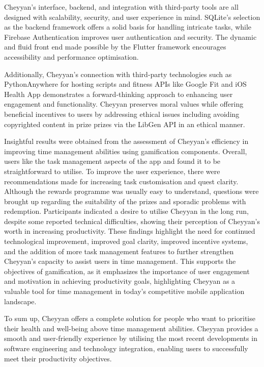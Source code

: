 \documentclass{l4proj}
\begin{document}
Cheyyan's interface, backend, and integration with third-party tools are all designed with scalability, security, and user experience in mind. SQLite's selection as the backend framework offers a solid basis for handling intricate tasks, while Firebase Authentication improves user authentication and security. The dynamic and fluid front end made possible by the Flutter framework encourages accessibility and performance optimisation.

Additionally, Cheyyan's connection with third-party technologies such as PythonAnywhere for hosting scripts and fitness APIs like Google Fit and iOS Health App demonstrates a forward-thinking approach to enhancing user engagement and functionality. Cheyyan preserves moral values while offering beneficial incentives to users by addressing ethical issues including avoiding copyrighted content in prize prizes via the LibGen API in an ethical manner.

Insightful results were obtained from the assessment of Cheyyan's efficiency in improving time management abilities using gamification components. Overall, users like the task management aspects of the app and found it to be straightforward to utilise. To improve the user experience, there were recommendations made for increasing task customisation and quest clarity. Although the rewards programme was usually easy to understand, questions were brought up regarding the suitability of the prizes and sporadic problems with redemption. Participants indicated a desire to utilise Cheyyan in the long run, despite some reported technical difficulties, showing their perception of Cheyyan's worth in increasing productivity. These findings highlight the need for continued technological improvement, improved goal clarity, improved incentive systems, and the addition of more task management features to further strengthen Cheyyan's capacity to assist users in time management. This supports the objectives of gamification, as it emphasizes the importance of user engagement and motivation in achieving productivity goals, highlighting Cheyyan as a valuable tool for time management in today's competitive mobile application landscape.

To sum up, Cheyyan offers a complete solution for people who want to prioritise their health and well-being above time management abilities. Cheyyan provides a smooth and user-friendly experience by utilising the most recent developments in software engineering and technology integration, enabling users to successfully meet their productivity objectives.
\end{document}
